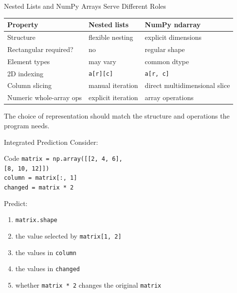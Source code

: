 \documentclass[aspectratio=169,10pt]{beamer}
\begin{document}
\begin{frame}{Nested Lists and NumPy Arrays Serve Different Roles}
  \begin{center}
    \renewcommand{\arraystretch}{1.30}
    \begin{tabular}{l|l|l}
      \textbf{Property} & \textbf{Nested lists} & \textbf{NumPy ndarray} \\\hline
      Structure & flexible nesting & explicit dimensions \\
      Rectangular required? & no & regular shape \\
      Element types & may vary & common dtype \\
      2D indexing & \texttt{a[r][c]} & \texttt{a[r, c]} \\
      Column slicing & manual iteration & direct multidimensional slice \\
      Numeric whole-array ops & explicit iteration & array operations
    \end{tabular}
  \end{center}

  \begin{keyidea}
    The choice of representation should match the structure and operations the program needs.
  \end{keyidea}
\end{frame}

\begin{frame}{Integrated Prediction}
  Consider:

  \begin{block}{Code}
    \texttt{matrix = np.array([[2, 4, 6],}\\
    \hspace*{1.22in}\texttt{[8, 10, 12]])}\\[0.08in]
    \texttt{column = matrix[:, 1]}\\
    \texttt{changed = matrix * 2}
  \end{block}

  Predict:
  \begin{enumerate}
    \item \texttt{matrix.shape}
    \item the value selected by \texttt{matrix[1, 2]}
    \item the values in \texttt{column}
    \item the values in \texttt{changed}
    \item whether \texttt{matrix * 2} changes the original \texttt{matrix}
  \end{enumerate}
\end{frame}
\end{document}
